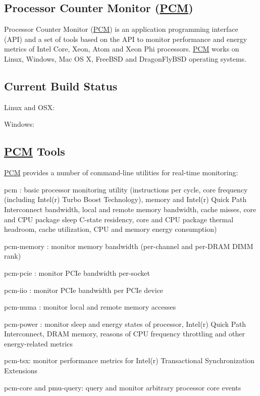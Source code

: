 

 \subsection*{Processor Counter Monitor (\mbox{\hyperlink{class_p_c_m}{P\+CM}}) }

Processor Counter Monitor (\mbox{\hyperlink{class_p_c_m}{P\+CM}}) is an application programming interface (A\+PI) and a set of tools based on the A\+PI to monitor performance and energy metrics of Intel\textregistered{} Core\texttrademark{}, Xeon\textregistered{}, Atom\texttrademark{} and Xeon Phi\texttrademark{} processors. \mbox{\hyperlink{class_p_c_m}{P\+CM}} works on Linux, Windows, Mac OS X, Free\+B\+SD and Dragon\+Fly\+B\+SD operating systems. 

 \subsection*{Current Build Status }


\begin{DoxyItemize}
\item Linux and O\+SX\+: \href{https://travis-ci.org/opcm/pcm}{\tt }
\item Windows\+: \href{https://ci.appveyor.com/project/opcm/pcm}{\tt } 

 \subsection*{\mbox{\hyperlink{class_p_c_m}{P\+CM}} Tools }
\end{DoxyItemize}

\mbox{\hyperlink{class_p_c_m}{P\+CM}} provides a number of command-\/line utilities for real-\/time monitoring\+:


\begin{DoxyItemize}
\item pcm \+: basic processor monitoring utility (instructions per cycle, core frequency (including Intel(r) Turbo Boost Technology), memory and Intel(r) Quick Path Interconnect bandwidth, local and remote memory bandwidth, cache misses, core and C\+PU package sleep C-\/state residency, core and C\+PU package thermal headroom, cache utilization, C\+PU and memory energy consumption)
\item pcm-\/memory \+: monitor memory bandwidth (per-\/channel and per-\/\+D\+R\+AM D\+I\+MM rank)
\item pcm-\/pcie \+: monitor P\+C\+Ie bandwidth per-\/socket
\item pcm-\/iio \+: monitor P\+C\+Ie bandwidth per P\+C\+Ie device
\item pcm-\/numa \+: monitor local and remote memory accesses
\item pcm-\/power \+: monitor sleep and energy states of processor, Intel(r) Quick Path Interconnect, D\+R\+AM memory, reasons of C\+PU frequency throttling and other energy-\/related metrics
\item pcm-\/tsx\+: monitor performance metrics for Intel(r) Transactional Synchronization Extensions
\item pcm-\/core and pmu-\/query\+: query and monitor arbitrary processor core events
\end{DoxyItemize}

